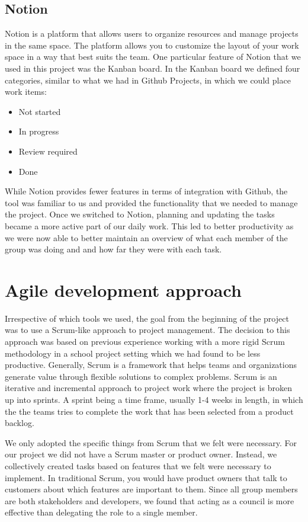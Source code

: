 \subsection{Notion}
Notion is a platform that allows users to organize resources and manage projects in the same space. The platform allows you to customize the layout of your work space in a way that best suits the team. One particular feature of Notion that we used in this project was the Kanban board. In the Kanban board we defined four categories, similar to what we had in Github Projects, in which we could place work items:

\begin{itemize}
    \item Not started
    \item In progress
    \item Review required
    \item Done
\end{itemize}

While Notion provides fewer features in terms of integration with Github, the tool was familiar to us and provided the functionality that we needed to manage the project.
Once we switched to Notion, planning and updating the tasks became a more active part of our daily work. This led to better productivity as we were now able to better maintain an overview of what each member of the group was doing and and how far they were with each task.

\section{Agile development approach} \label{sec:agile-dev}
Irrespective of which tools we used, the goal from the beginning of the project was to use a Scrum-like approach to project management.
The decision to this approach was based on previous experience working with a more rigid Scrum methodology in a school project setting which we had found to be less productive.
Generally, Scrum is a framework that helps teams and organizations generate value through flexible solutions to complex problems. Scrum is an iterative and incremental approach to project work where the project is broken up into sprints. A sprint being a time frame, usually 1-4 weeks in length, in which the the teams tries to complete the work that has been selected from a product backlog.

We only adopted the specific things from Scrum that we felt were necessary. For our project we did not have a Scrum master or product owner. Instead, we collectively created tasks based on features that we felt were necessary to implement.
In traditional Scrum, you would have product owners that talk to customers about which features are important to them. Since all group members are both stakeholders and developers, we found that acting as a council is more effective than delegating the role to a single member.

